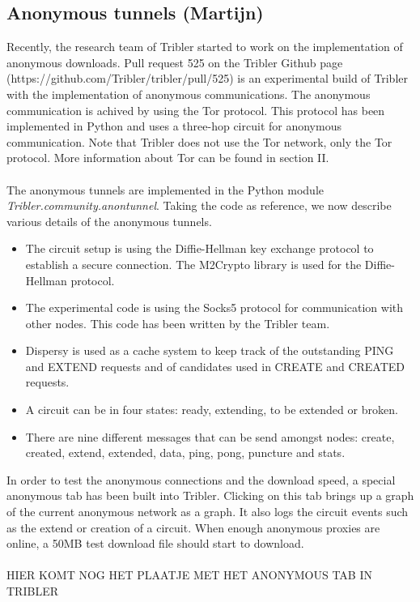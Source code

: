 \documentclass[11pt]{article}
\begin{document}
\subsection{Anonymous tunnels (Martijn)}
Recently, the research team of Tribler started to work on the implementation of anonymous downloads. Pull request 525 on the Tribler Github page (https://github.com/Tribler/tribler/pull/525) is an experimental build of Tribler with the implementation of anonymous communications. The anonymous communication is achived by using the Tor protocol. This protocol has been implemented in Python and uses a three-hop circuit for anonymous communication. Note that Tribler does not use the Tor network, only the Tor protocol. More information about Tor can be found in section II.\\\\
The anonymous tunnels are implemented in the Python module \emph{Tribler.community.anontunnel}. Taking the code as reference, we now describe various details of the anonymous tunnels.
\begin{itemize} 
\item The circuit setup is using the Diffie-Hellman key exchange protocol to establish a secure connection. The M2Crypto library is used for the Diffie-Hellman protocol.
\item The experimental code is using the Socks5 protocol for communication with other nodes. This code has been written by the Tribler team.
\item Dispersy is used as a cache system to keep track of the outstanding PING and EXTEND requests and of candidates used in CREATE and CREATED requests.
\item A circuit can be in four states: ready, extending, to be extended or broken.
\item There are nine different messages that can be send amongst nodes: create, created, extend, extended, data, ping, pong, puncture and stats.
\end{itemize}
In order to test the anonymous connections and the download speed, a special anonymous tab has been built into Tribler. Clicking on this tab brings up a graph of the current anonymous network as a graph. It also logs the circuit events such as the extend or creation of a circuit. When enough anonymous proxies are online, a 50MB test download file should start to download.\\\\
HIER KOMT NOG HET PLAATJE MET HET ANONYMOUS TAB IN TRIBLER
\end{document}
